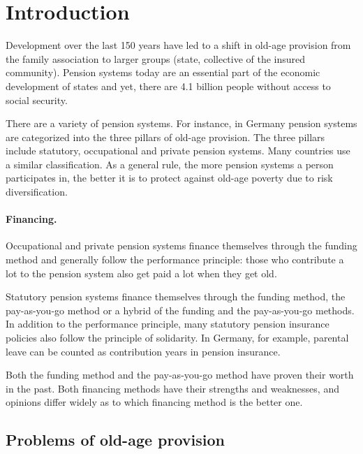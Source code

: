 \section{Introduction}

Development over the last 150 years have led to a shift in old-age provision from the family association to larger groups (state, collective of the insured community). Pension systems today are an essential part of the economic development of states and yet, there are 4.1 billion people without access to social security.\cite{noauthor_universal_2017}

There are a variety of pension systems. For instance, in Germany pension systems are categorized into the three pillars of old-age provision. The three pillars include statutory, occupational and private pension systems. Many countries use a similar classification. As a general rule, the more pension systems a person participates in, the better it is to protect against old-age poverty due to risk diversification.

\paragraph{Financing.} Occupational and private pension systems finance themselves through the funding method and generally follow the performance principle: those who contribute a lot to the pension system also get paid a lot when they get old.

Statutory pension systems finance themselves through the funding method, the pay-as-you-go method or a hybrid of the funding and the pay-as-you-go methods. In addition to the performance principle, many statutory pension insurance policies also follow the principle of solidarity. In Germany, for example, parental leave can be counted as contribution years in pension insurance.

Both the funding method and the pay-as-you-go method have proven their worth in the past. Both financing methods have their strengths and weaknesses, and opinions differ widely as to which financing method is the better one.

\subsection{Problems of old-age provision}

